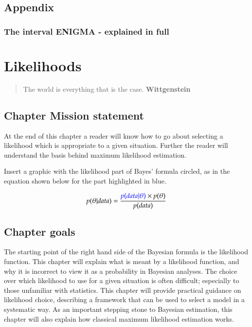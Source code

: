 \documentclass[11pt,fullpage]{book}
\begin{document}
\section{Appendix}
\subsection{The interval ENIGMA - explained in full}\label{sec:Posterior_appendixConfidenceInterval}


\chapter{Likelihoods}\label{chap:Likelihoods}
\begin{quotation}
The world is everything that is the case. \textbf{Wittgenstein}
\end{quotation}

\section{Chapter Mission statement}
At the end of this chapter a reader will know how to go about selecting a likelihood which is appropriate to a given situation. Further the reader will understand the basis behind maximum likelihood estimation.

Insert a graphic with the likelihood part of Bayes' formula circled, as in the equation shown below for the part highlighted in blue.

\begin{equation}
p(\theta|data) = \frac{{\color{blue}p(data|\theta)}\times p(\theta)}{p(data)}
\end{equation}\label{eq:Likelihood_BayesHighlighted}

\section{Chapter goals}
The starting point of the right hand side of the Bayesian formula is the likelihood function. This chapter will explain what is meant by a likelihood function, and why it is incorrect to view it as a probability in Bayesian analyses. The choice over which likelihood to use for a given situation is often difficult; especially to those unfamiliar with statistics. This chapter will provide practical guidance on likelihood choice, describing a framework that can be used to select a model in a systematic way. As an important stepping stone to Bayesian estimation, this chapter will also explain how classical maximum likelihood estimation works. 
\end{document}
